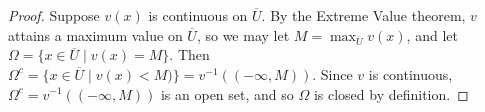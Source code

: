 \documentclass[11pt,oneside,english]{amsart}
\theoremstyle{definition}
\begin{document}
\begin{enumerate}
\begin{enumerate}
\begin{proof}
Suppose $v(x)$ is continuous on $\overline{U}$. By the Extreme Value theorem, $v$ attains a maximum value on $\overline{U}$, so we may let $M=\max_{\overline{U}}v(x)$, and let $\Omega=\{x\in \overline{U}\mid v(x)=M\}$. Then $\Omega^c=\{x\in \overline{U}\mid v(x)<M)\}=v^{-1}((-\infty,M))$. Since $v$ is continuous, $\Omega^c=v^{-1}((-\infty,M))$ is an open set, and so $\Omega$ is closed by definition.
\end{proof}

\end{enumerate}




\end{enumerate}
\end{document}
